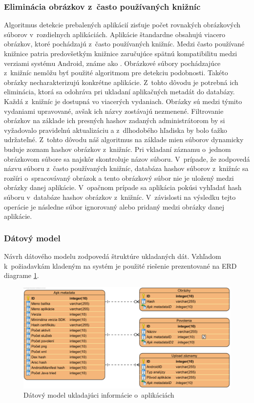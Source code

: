 \subsubsection{\textbf{Eliminácia obrázkov z~často používaných knižníc}}
\label{sec:eliminacia-kniznic}
Algoritmus detekcie prebalených aplikácií zisťuje počet rovnakých obrázkových súborov v~rozdielnych aplikáciách. Aplikácie štandardne obsahujú viacero obrázkov, ktoré pochádzajú z~často používaných knižníc. Medzi často používané knižnice patria predovšetkým knižnice zaručujúce spätnú kompatibilitu medzi verziami systému Android, známe ako . Obrázkové súbory pochádzajúce z~knižníc nemôžu byť použité algoritmom pre detekciu podobnosti. Takéto obrázky necharakterizujú konkrétne aplikácie. Z~tohto dôvodu je potrebná ich eliminácia, ktorá sa odohráva pri ukladaní aplikačných metadát do databázy. Každá z~knižníc je dostupná vo viacerých vydaniach. Obrázky sú medzi týmito vydaniami upravované, avšak ich názvy zostávajú nezmenené. Filtrovanie obrázkov na základe ich presných hashov zadaných administrátorom by si vyžadovalo pravidelnú aktualizáciu a z~dlhodobého hľadiska by bolo ťažko udržateľné. Z~tohto dôvodu náš algoritmus na základe mien súborov dynamicky buduje zoznam hashov obrázkov z~knižníc. Pri vkladaní záznamu o~jednom obrázkovom súbore sa najskôr skontroluje názov súboru. V~prípade, že zodpovedá názvu súboru z~často používaných knižníc, databáza hashov súborov z~knižníc sa rozšíri o~spracovávaný obrázok a tento obrázkový súbor nie je uložený medzi obrázky danej aplikácie. V~opačnom prípade sa aplikácia pokúsi vyhľadať hash súboru v~databáze hashov obrázkov z~knižníc. V~závislosti na výsledku tejto operácie je následne súbor ignorovaný alebo pridaný medzi obrázky danej aplikácie.

\subsubsection{\textbf{Dátový model}}
Návrh dátového modelu zodpovedá štruktúre ukladaných dát. Vzhľadom k~požiadavkám kladeným na systém  je použité riešenie prezentované na ERD diagrame \ref{fig:detectionDbErd}. 

\begin{figure}[htb]
  \begin{center}
    \includegraphics[width=130mm]{images/detection-db-erd.png}
  \end{center}
  \caption{Dátový model ukladajúci informácie o~aplikáciách}
  \label{fig:detectionDbErd}
\end{figure}


